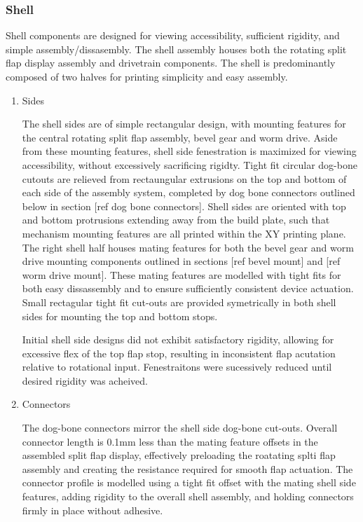 \documentclass[11pt]{article}
\begin{document}
\subsubsection{Shell}
\label{sec:orgaff5752}
Shell components are designed for viewing accessibility, sufficient rigidity, and simple assembly/dissasembly. The shell assembly houses both the rotating split flap display assembly and drivetrain components. The shell is predominantly composed of two halves for printing simplicity and easy assembly.

\begin{enumerate}
\item Sides
\label{sec:org362a846}

The shell sides are of simple rectangular design, with mounting features for the central rotating split flap assembly, bevel gear and worm drive. Aside from these mounting features, shell side fenestration is maximized for viewing accessibility, without excessively sacrificing rigidty. Tight fit circular dog-bone cutouts are relieved from rectaungular extrusions on the top and bottom of each side of the assembly system, completed by dog bone connectors outlined below in section [ref dog bone connectors]. Shell sides are oriented with top and bottom protrusions extending away from the build plate, such that mechanism mounting features are all printed within the XY printing plane. The right shell half houses mating features for both the bevel gear and worm drive mounting components outlined in sections [ref bevel mount] and [ref worm drive mount]. These mating features are modelled with tight fits for both easy dissassembly and to ensure sufficiently consistent device actuation. Small rectagular tight fit cut-outs are provided symetrically in both shell sides for mounting the top and bottom stops.

Initial shell side designs did not exhibit satisfactory rigidity, allowing for excessive flex of the top flap stop, resulting in inconsistent flap acutation relative to rotational input. Fenestraitons were sucessively reduced until desired rigidity was acheived.  

\item Connectors
\label{sec:org84ac973}

The dog-bone connectors mirror the shell side dog-bone cut-outs. Overall connector length is 0.1mm less than the mating feature offsets in the assembled split flap display, effectively preloading the roatating splti flap assembly and creating the resistance required for smooth flap actuation. The connector profile is modelled using a tight fit offset with the mating shell side features, adding rigidity to the overall shell assembly, and holding connectors firmly in place without adhesive.


\end{enumerate}
\end{document}
